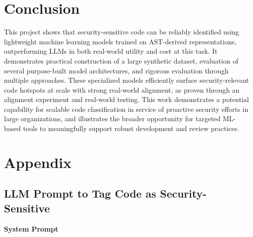 \documentclass[11pt]{article}
\begin{document}
\section{Conclusion}\label{conclusion}

This project shows that security-sensitive code can be reliably
identified using lightweight machine learning models trained on
AST-derived representations, outperforming LLMs in both real-world
utility and cost at this task. It demonstrates practical construction of
a large synthetic dataset, evaluation of several purpose-built model
architectures, and rigorous evaluation through multiple approaches.
These specialized models efficiently surface security-relevant code
hotspots at scale with strong real-world alignment, as proven through
an alignment experiment and real-world testing. This work demonstrates
a potential capability for scalable code classification in service of 
proactive security efforts in large organizations, and illustrates the 
broader opportunity for targeted ML-based tools to meaningfully support robust
development and review practices.

\appendix

\section{Appendix}\label{appendix}

\subsection{LLM Prompt to Tag Code as Security-Sensitive}\label{llm-prompt-to-tag-code-as-security-sensitive}

\textbf{System Prompt}
\end{document}
